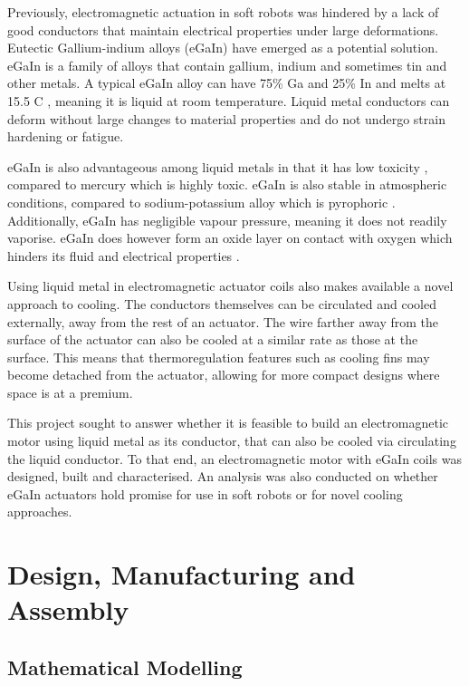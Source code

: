 \documentclass[a4paper,12pt]{article}
\begin{document}
Previously, electromagnetic actuation in soft robots was hindered by a lack of good conductors that maintain electrical properties under large deformations. Eutectic Gallium-indium alloys (eGaIn) have emerged as a potential solution. eGaIn is a family of alloys that contain gallium, indium and sometimes tin and other metals. A typical eGaIn alloy can have 75\% Ga and 25\% In and melts at 15.5 \degree C \cite{dickeyEutecticGalliumIndiumEGaIn2008}, meaning it is liquid at room temperature. Liquid metal conductors can deform without large changes to material properties and do not undergo strain hardening or fatigue.

eGaIn is also advantageous among liquid metals in that it has low toxicity \cite{dickeyEutecticGalliumIndiumEGaIn2008}, compared to mercury which is highly toxic. eGaIn is also stable in atmospheric conditions, compared to sodium-potassium alloy which is pyrophoric \cite{houghtonHazards2007}. Additionally, eGaIn has negligible vapour pressure, meaning it does not readily vaporise. eGaIn does however form an oxide layer on contact with oxygen which hinders its fluid and electrical properties \cite{liuCharacterizationNontoxicLiquidMetal2012}.

Using liquid metal in electromagnetic actuator coils also makes available a novel approach to cooling. The conductors themselves can be circulated and cooled externally, away from the rest of an actuator. The wire farther away from the surface of the actuator can also be cooled at a similar rate as those at the surface. This means that thermoregulation features such as cooling fins may become detached from the actuator, allowing for more compact designs where space is at a premium.

This project sought to answer whether it is feasible to build an electromagnetic motor using liquid metal as its conductor, that can also be cooled via circulating the liquid conductor. To that end, an electromagnetic motor with eGaIn coils was designed, built and characterised. An analysis was also conducted on whether eGaIn actuators hold promise for use in soft robots or for novel cooling approaches.

\newpage

\section{Design, Manufacturing and Assembly}
\subsection{Mathematical Modelling} \label{section:mm}
\end{document}
